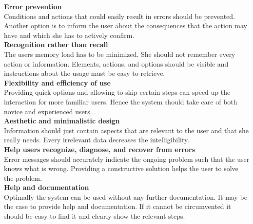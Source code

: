 \textbf{Error prevention}\\
Conditions and actions that could easily result in errors should be prevented. Another option is to inform the user about the consequences that the action may have and which she has to actively confirm.\\

\textbf{Recognition rather than recall}\\
The users memory load has to be minimized. She should not remember every action or information. Elements, actions, and options should be visible and instructions about the usage must be easy to retrieve.\\

\textbf{Flexibility and efficiency of use}\\
Providing quick options and allowing to skip certain steps can speed up the interaction for more familiar users. Hence the system should take care of both novice and experienced users.\\

\textbf{Aesthetic and minimalistic design}\\
Information should just contain aspects that are relevant to the user and that she really needs. Every irrelevant data decreases the intelligibility.\\

\textbf{Help users recognize, diagnose, and recover from errors}\\
Error messages should accurately indicate the ongoing problem such that the user knows what is wrong. Providing a constructive solution helps the user to solve the problem.\\

\textbf{Help and documentation}\\
Optimally the system can be used without any further documentation. It may be the case to provide help and documentation. If it cannot be circumvented it should be easy to find it and clearly show the relevant steps.\\

